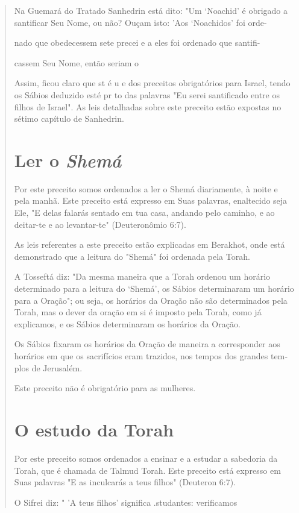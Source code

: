 \begin{quote}
Na Guemará do Tratado Sanhedrin está dito: "Um `Noachid' é obri­gado a
santificar Seu Nome, ou não? Ouçam isto: 'Aos `Noachidos' foi orde-

nado que obedecessem sete precei e a eles foi ordenado que santifi-

cassem Seu Nome, então seriam o

Assim, ficou claro que st é u e dos preceitos obrigatórios para Is­rael,
tendo os Sábios deduzido esté pr to das palavras "Eu serei santificado
entre os filhos de Israel". As leis detalhadas sobre este preceito estão
expostas no sétimo capítulo de Sanhedrin.

\section{Ler o \textit{Shemá}}

Por este preceito somos ordenados a ler o Shemá diariamente, à noi­te e
pela manhã. Este preceito está expresso em Suas palavras, enaltecido
seja Ele, "E delas falarás sentado em tua casa, andando pelo caminho, e
ao deitar-te e ao levantar-te" (Deuteronômio 6:7).

As leis referentes a este preceito estão explicadas em Berakhot, on­de
está demonstrado que a leitura do "Shemá" foi ordenada pela Torah.

A Tosseftá diz: "Da mesma maneira que a Torah ordenou um horá­rio
determinado para a leitura do `Shemá', os Sábios determinaram um horário
para a Oração"; ou seja, os horários da Oração não são determinados pela
To­rah, mas o dever da oração em si é imposto pela Torah, como já
explicamos, e os Sábios determinaram os horários da Oração.

Os Sábios fixaram os horários da Oração de maneira a corresponder aos
horários em que os sacrifícios eram trazidos, nos tempos dos grandes
tem­plos de Jerusalém.

Este preceito não é obrigatório para as mulheres.

\section{O estudo da Torah}

Por este preceito somos ordenados a ensinar e a estudar a sabedoria da
Torah, que é chamada de Talmud Torah. Este preceito está expresso em
Suas palavras "E as inculcarás a teus filhos" (Deuteron 6:7).

O Sifrei diz: " 'A teus filhos' significa .studantes: verificamos
\end{quote}

